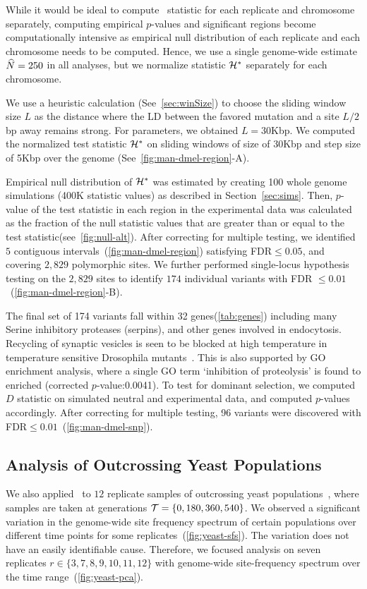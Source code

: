 While it would be ideal to compute \comale\ statistic for each
replicate and chromosome separately, computing empirical $p$-values
and significant regions become computationally intensive as empirical
null distribution of each replicate and each chromosome needs to be
computed.  Hence, we use a single genome-wide estimate $\widehat{N}=250$ in
all analyses, but we normalize statistic ${\cal H}^*$ separately for each
chromosome.

We use a heuristic calculation (See~\ref{sec:winSize}) to choose the
sliding window size $L$ as the distance where the LD between the
favored mutation and a site $L/2$bp away remains strong. For \dmel
parameters, we obtained $L=30$Kbp. We computed the normalized test
statistic ${\cal H}^*$ on sliding windows of size of 30Kbp and step size of
5Kbp over the genome (See~\ref{fig:man-dmel-region}-A).

Empirical null distribution of ${\cal H}^*$ was estimated by creating 100
whole genome simulations (400K statistic values) as described in
Section~\ref{sec:sims}. Then, $p$-value of the test statistic in each
region in the experimental data was calculated as the fraction of the
null statistic values that are greater than or equal to the test
statistic(see~\ref{fig:null-alt}).  After correcting for multiple
testing, we identified $5$ contiguous
intervals~(\ref{fig:man-dmel-region}) satisfying FDR$\le0.05$, and
covering $2,829$ polymorphic sites. We further performed single-locus
hypothesis testing on the $2,829$ sites to identify $174$ individual
variants with FDR $\le0.01$~(\ref{fig:man-dmel-region}-B).

The final set of 174 variants fall within 32 genes(\ref{tab:genes})
including many Serine inhibitory proteases (serpins), and other genes
involved in endocytosis. Recycling of synaptic vesicles is seen to be
blocked at high temperature in temperature sensitive Drosophila
mutants~\cite{kosaka1983reversible}. This is also supported by GO
enrichment analysis, where a single GO term `inhibition of
proteolysis' is found to enriched (corrected $p$-value:0.0041).  To
test for dominant selection, we computed $D$ statistic on simulated
neutral and experimental data, and computed $p$-values accordingly.
After correcting for multiple testing, 96 variants were discovered
with FDR$\le 0.01$~(\ref{fig:man-dmel-snp}). 


\subsection{Analysis of Outcrossing Yeast Populations}
We also applied \comale\ to  $12$ replicate samples of
outcrossing yeast populations~\cite{burke2014standing}, where samples are 
taken at
generations ${\cal T}=\{0,180,360,540\}$. We observed a significant
variation in the genome-wide site frequency spectrum of certain
populations over different time points for some
replicates~(\ref{fig:yeast-sfs}). The variation does not have an
easily identifiable cause. Therefore, we focused analysis on seven
replicates $r\in\{3,7,8,9,10,11,12\}$ with genome-wide site-frequency
spectrum over the time range~(\ref{fig:yeast-pca}).

